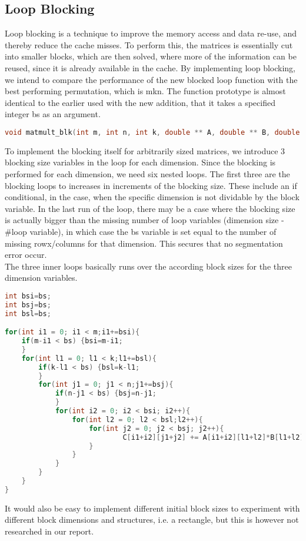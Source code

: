 \subsection{Loop Blocking}

Loop blocking is a technique to improve the memory access and data re-use, and thereby reduce the cache misses. To perform this, the matrices is essentially cut into smaller blocks, which are then solved, where more of the information can be reused, since it is already available in the cache. By implementing loop blocking, we intend to compare the performance of the new blocked loop function with the best performing permutation, which is mkn. The function prototype is almost identical to the earlier used with the new addition, that it takes a specified integer bs as an argument.

\begin{lstlisting}[language=C++, caption=Function Prototype]
void matmult_blk(int m, int n, int k, double ** A, double ** B, double ** C, int bs)
\end{lstlisting}

To implement the blocking itself for arbitrarily sized matrices, we introduce 3 blocking size variables in the loop for each dimension. Since the blocking is performed for each dimension, we need six nested loops. The first three are the blocking loops to increases in increments of the blocking size. These include an if conditional, in the case, when the specific dimension is not dividable by the block variable. In the last run of the loop, there may be a case where the blocking size is actually bigger than the missing number of loop variables (dimension size - #loop variable), in which case the bs variable is set equal to the number of missing rowx/columns for that dimension. This secures that no segmentation error occur.\\

The three inner loops basically runs over the according block sizes for the three dimension variables.

\begin{lstlisting}[language=C++, caption=Function Prototype]
int bsi=bs;
int bsj=bs;
int bsl=bs;

for(int i1 = 0; i1 < m;i1+=bsi){
	if(m-i1 < bs) {bsi=m-i1;
	}
	for(int l1 = 0; l1 < k;l1+=bsl){
		if(k-l1 < bs) {bsl=k-l1;
		}
		for(int j1 = 0; j1 < n;j1+=bsj){
			if(n-j1 < bs) {bsj=n-j1;
			}
			for(int i2 = 0; i2 < bsi; i2++){	
				for(int l2 = 0; l2 < bsl;l2++){	
					for(int j2 = 0; j2 < bsj; j2++){	
							C[i1+i2][j1+j2] += A[i1+i2][l1+l2]*B[l1+l2][j1+j2];
					}
				}
			}
		}
	}
}
\end{lstlisting}

It would also be easy to implement different initial block sizes to experiment with different block dimensions and structures, i.e. a rectangle, but this is however not researched in our report. 